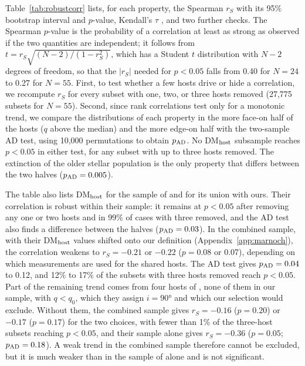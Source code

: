\documentclass[apjl, linenumbers]{aastex701}
\begin{document}
Table~\ref{tab:robustcorr} lists, for each property, the Spearman $r_S$ with
its 95\% bootstrap interval \citep{Efron1979} and $p$-value, Kendall's $\tau$
\citep{Kendall1938}, and two further checks. The Spearman $p$-value is the
probability of a correlation at least as strong as observed if the two
quantities are independent; it follows from
$t = r_S\sqrt{(N-2)/(1-r_S^2)}$, which has a Student $t$ distribution with
$N-2$ degrees of freedom, so that the $|r_S|$ needed for $p < 0.05$ falls from
0.40 for $N = 24$ to 0.27 for $N = 55$. First, to test whether a few hosts
drive or hide a correlation, we recompute $r_S$ for every subset with one,
two, or three hosts removed (27{,}775 subsets for $N = 55$). Second, since
rank correlations test only for a monotonic trend, we compare the
distributions of each property in the more face-on half of the hosts ($q$
above the median) and the more edge-on half with the two-sample AD test, using
10{,}000 permutations to obtain $p_{\rm AD}$. No DM$_{\rm host}$ subsample
reaches $p < 0.05$ in either test, for any subset with up to three hosts
removed. The extinction of the older stellar population is the only property
that differs between the two halves ($p_{\rm AD} = 0.005$).

The table also lists DM$_{\rm host}$ for the sample of \citet{marnoch2026}
and for its union with ours. Their correlation is robust within their sample:
it remains at $p < 0.05$ after removing any one or two hosts and in 99\% of
cases with three removed, and the AD test also finds a difference between the halves
($p_{\rm AD} = 0.03$). In the combined sample, with their DM$_{\rm host}$
values shifted onto our definition (Appendix~\ref{app:marnoch}), the
correlation weakens to $r_S = -0.21$ or $-0.22$ ($p = 0.08$ or 0.07),
depending on which measurements are used for the shared hosts. The AD test
gives $p_{\rm AD} = 0.04$ to 0.12, and 12\% to 17\% of the subsets with three
hosts removed reach $p < 0.05$. Part of the remaining trend comes from four
hosts of \citet{marnoch2026}, none of them in our sample, with $q < q_0$,
which they assign $i = \ang{90}$ and which our selection would exclude.
Without them, the combined sample gives $r_S = -0.16$ ($p = 0.20$) or
$-0.17$ ($p = 0.17$) for the two choices, with fewer than 1\% of the
three-host subsets reaching $p < 0.05$, and their sample alone gives
$r_S = -0.36$ ($p = 0.05$; $p_{\rm AD} = 0.18$). A weak trend in the
combined sample therefore cannot be excluded, but it is much weaker than in
the sample of \citet{marnoch2026} alone and is not significant.
\end{document}
